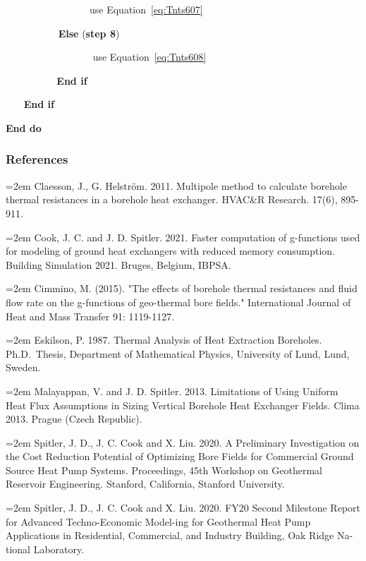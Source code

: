 ~~~~~~~~~~~~~~~~~use Equation~\ref{eq:Tnts607}

~~~~~~~~~~ \textbf{Else} (\textbf{step 8})

~~~~~~~~~~~~~~~~~ use Equation~\ref{eq:Tnts608}

~~~ ~~~~~~ \textbf{End if}

~~~ \textbf{End if}

\textbf{End do}

\subsubsection{References}\label{references-2-006}

\hangindent=2em
\noindent Claesson, J., G. Helstr{\"o}m. 2011. Multipole method to calculate borehole thermal resistances in a borehole heat exchanger. HVAC\&R Research. 17(6), 895-911.

\hangindent=2em
\noindent Cook, J. C. and J. D. Spitler. 2021. Faster computation of g-functions used for modeling of ground heat exchangers with reduced memory consumption. Building Simulation 2021. Bruges, Belgium, IBPSA.

\hangindent=2em
\noindent Cimmino, M. (2015). "The effects of borehole thermal resistances and fluid flow rate on the g-functions of geo-thermal bore fields." International Journal of Heat and Mass Transfer 91: 1119-1127.


\hangindent=2em
\noindent Eskilson, P. 1987. Thermal Analysis of Heat Extraction Boreholes. Ph.D.~Thesis, Department of Mathematical Physics, University of Lund, Lund, Sweden.

\hangindent=2em
\noindent Malayappan, V. and J. D. Spitler. 2013. Limitations of Using Uniform Heat Flux Assumptions in Sizing Vertical Borehole Heat Exchanger Fields. Clima 2013. Prague (Czech Republic).

\hangindent=2em
\noindent Spitler, J. D., J. C. Cook and X. Liu. 2020. A Preliminary Investigation on the Cost Reduction Potential of Optimizing Bore Fields for Commercial Ground Source Heat Pump Systems. Proceedings, 45th Workshop on Geothermal Reservoir Engineering. Stanford, California, Stanford University. 

\hangindent=2em
\noindent Spitler, J. D., J. C. Cook and X. Liu. 2020. FY20 Second Milestone Report for Advanced Techno-Economic Model-ing for Geothermal Heat Pump Applications in Residential, Commercial, and Industry Building, Oak Ridge Na-tional Laboratory.


